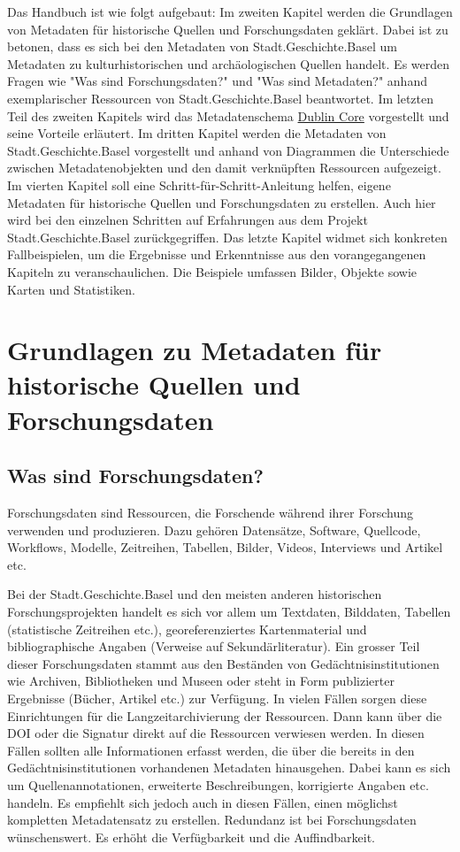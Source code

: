 \documentclass[
  nswissgerman,
  letterpaper,
  DIV=11,
  numbers=noendperiod]{scrartcl}
\begin{document}
Das Handbuch ist wie folgt aufgebaut: Im zweiten Kapitel werden die
Grundlagen von Metadaten für historische Quellen und Forschungsdaten
geklärt. Dabei ist zu betonen, dass es sich bei den Metadaten von
Stadt.Geschichte.Basel um Metadaten zu kulturhistorischen und
archäologischen Quellen handelt. Es werden Fragen wie "Was sind
Forschungsdaten?" und "Was sind Metadaten?" anhand exemplarischer
Ressourcen von Stadt.Geschichte.Basel beantwortet. Im letzten Teil des
zweiten Kapitels wird das Metadatenschema
\href{https://www.dublincore.org}{Dublin Core} vorgestellt und seine
Vorteile erläutert. Im dritten Kapitel werden die Metadaten von
Stadt.Geschichte.Basel vorgestellt und anhand von Diagrammen die
Unterschiede zwischen Metadatenobjekten und den damit verknüpften
Ressourcen aufgezeigt. Im vierten Kapitel soll eine
Schritt-für-Schritt-Anleitung helfen, eigene Metadaten für historische
Quellen und Forschungsdaten zu erstellen. Auch hier wird bei den
einzelnen Schritten auf Erfahrungen aus dem Projekt
Stadt.Geschichte.Basel zurückgegriffen. Das letzte Kapitel widmet sich
konkreten Fallbeispielen, um die Ergebnisse und Erkenntnisse aus den
vorangegangenen Kapiteln zu veranschaulichen. Die Beispiele umfassen
Bilder, Objekte sowie Karten und Statistiken.

\section{Grundlagen zu Metadaten für historische Quellen und
Forschungsdaten}\label{grundlagen-zu-metadaten-fuxfcr-historische-quellen-und-forschungsdaten}

\subsection{Was sind Forschungsdaten?}\label{was-sind-forschungsdaten}

Forschungsdaten sind Ressourcen, die Forschende während ihrer Forschung
verwenden und produzieren. Dazu gehören Datensätze, Software, Quellcode,
Workflows, Modelle, Zeitreihen, Tabellen, Bilder, Videos, Interviews und
Artikel etc.

Bei der Stadt.Geschichte.Basel und den meisten anderen historischen
Forschungsprojekten handelt es sich vor allem um Textdaten, Bilddaten,
Tabellen (statistische Zeitreihen etc.), georeferenziertes
Kartenmaterial und bibliographische Angaben (Verweise auf
Sekundärliteratur). Ein grosser Teil dieser Forschungsdaten stammt aus
den Beständen von Gedächtnisinstitutionen wie Archiven, Bibliotheken und
Museen oder steht in Form publizierter Ergebnisse (Bücher, Artikel etc.)
zur Verfügung. In vielen Fällen sorgen diese Einrichtungen für die
Langzeitarchivierung der Ressourcen. Dann kann über die DOI oder die
Signatur direkt auf die Ressourcen verwiesen werden. In diesen Fällen
sollten alle Informationen erfasst werden, die über die bereits in den
Gedächtnisinstitutionen vorhandenen Metadaten hinausgehen. Dabei kann es
sich um Quellenannotationen, erweiterte Beschreibungen, korrigierte
Angaben etc. handeln. Es empfiehlt sich jedoch auch in diesen Fällen,
einen möglichst kompletten Metadatensatz zu erstellen. Redundanz ist bei
Forschungsdaten wünschenswert. Es erhöht die Verfügbarkeit und die
Auffindbarkeit.
\end{document}
